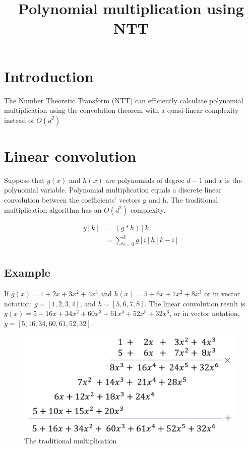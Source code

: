 \documentclass{techrep}
\title{Polynomial multiplication using NTT}
\theoremstyle{definition}
\theoremstyle{plain}
\begin{document}
\maketitle

\section{Introduction}
The Number Theoretic Transform (NTT) can efficiently calculate polynomial multiplication using the convolution theorem with a quasi-linear complexity instead of $O(d^2)$

\section{Linear convolution}
Suppose that $g(x)$ and $h(x)$ are polynomials of degree $d - 1$ and $x$ is the polynomial variable. Polynomial multiplication equals a discrete linear convolution between the coefficients’ vectors g and h. The traditional multiplication algorithm has an $O(d^2)$ complexity.

\begin{align*}
 y[k] &= (g*h)[k] \\
        &= \sum_{i=0}^{k}g[i]h[k-i] \\
\end{align*} 

\subsection{Example}
If $g(x) = 1 + 2x + 3x^2 + 4x^3$ and $h(x) = 5 + 6x + 7x^2 + 8x^3$ or in vector notation:  $g = [1, 2, 3, 4]$, and $h = [5, 6, 7, 8]$. The linear convolution result is $y(x) = 5 + 16x + 34x^2 + 60x^3 + 61x^4 + 52x^5 + 32x^6$, or in vector notation, $y = [5, 16, 34, 60, 61, 52, 32]$.

\begin{figure}[H]
 	\centering
 	\includegraphics[width=.7\columnwidth]{fig/trad_mult.png}
 	\caption{The traditional multiplication} 
\label{fig:TradMult}
\end{figure}
\end{document}
